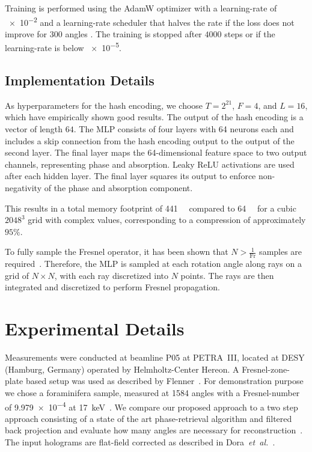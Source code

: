 \documentclass{article}
\begin{document}
Training is performed using the AdamW optimizer with a learning-rate of \num{e-2} and a learning-rate scheduler that halves the rate if the loss does not improve for $300$ angles \cite{loshchilovDecoupledWeightDecay2019}.
The training is stopped after $4000$ steps or if the learning-rate is below \num{e-5}.


\subsection{Implementation Details}
As hyperparameters for the hash encoding, we choose $T = 2^{21}$, $F = 4$, and $L = 16$, which have empirically shown good results.  
The output of the hash encoding is a vector of length $64$.  
The MLP consists of four layers with 64 neurons each and includes a skip connection from the hash encoding output to the output of the second layer.  
The final layer maps the 64-dimensional feature space to two output channels, representing phase and absorption.  
Leaky ReLU activations are used after each hidden layer.  
The final layer squares its output to enforce non-negativity of the phase and absorption component.  

This results in a total memory footprint of \qty{441}{\mega\byte} compared to \qty{64}{\gibi\byte} for a cubic $2048^3$ grid with complex values, corresponding to a compression of approximately $95\%$.  

To fully sample the Fresnel operator, it has been shown that $N > \frac{1}{\mathrm{Fr}}$ samples are required~\cite{paganinCoherentXrayOptics2006a}.  
Therefore, the MLP is sampled at each rotation angle along rays on a grid of $N \times N$, with each ray discretized into $N$ points.  
The rays are then integrated and discretized to perform Fresnel propagation.  
\section{Experimental Details}
Measurements were conducted at beamline P05 at PETRA~III, located at DESY (Hamburg, Germany) operated by Helmholtz-Center Hereon.
A Fresnel-zone-plate based setup was used as described by Flenner~\cite{flennerHardXrayNanoholotomography2020b}.
For demonstration purpose we chose a foraminifera sample, measured at 1584 angles with a Fresnel-number of \num{9.979e-4} at \qty{17}{\keV}~\cite{niEarlyDiagenesisForaminiferal2020}.
We compare our proposed approach to a two step approach consisting of a state of the art phase-retrieval algorithm and filtered back projection and evaluate how many angles are necessary for reconstruction~\cite{doraArtifactsuppressingReconstructionStrongly2024}.
The input holograms are flat-field corrected as described in Dora~\textit{et~al.}~\cite{doraArtifactsuppressingReconstructionStrongly2024}.



\vfill\pagebreak

\label{sec:refs}


\end{document}
